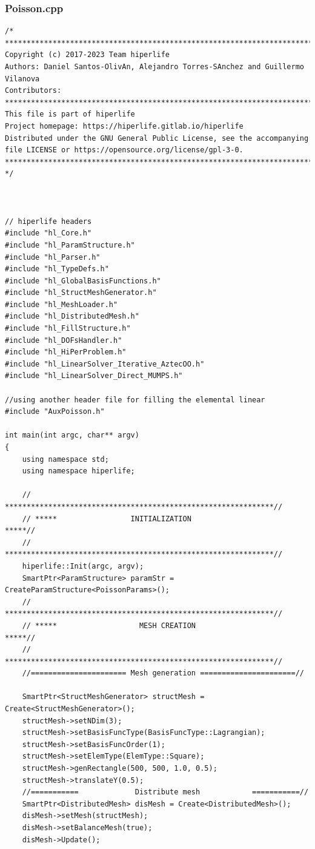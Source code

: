 \documentclass[]{article}
\begin{document}
\subsubsection{Poisson.cpp} \label{sec: m.cpp}
\nolinenumbers
\begin{lstlisting}
/*
*******************************************************************************
Copyright (c) 2017-2023 Team hiperlife
Authors: Daniel Santos-OlivAn, Alejandro Torres-SAnchez and Guillermo Vilanova
Contributors:
*******************************************************************************
This file is part of hiperlife
Project homepage: https://hiperlife.gitlab.io/hiperlife
Distributed under the GNU General Public License, see the accompanying
file LICENSE or https://opensource.org/license/gpl-3-0.
*******************************************************************************
*/



// hiperlife headers
#include "hl_Core.h"
#include "hl_ParamStructure.h"
#include "hl_Parser.h"
#include "hl_TypeDefs.h"
#include "hl_GlobalBasisFunctions.h" 
#include "hl_StructMeshGenerator.h"
#include "hl_MeshLoader.h"
#include "hl_DistributedMesh.h"
#include "hl_FillStructure.h"
#include "hl_DOFsHandler.h"
#include "hl_HiPerProblem.h"
#include "hl_LinearSolver_Iterative_AztecOO.h"
#include "hl_LinearSolver_Direct_MUMPS.h"

//using another header file for filling the elemental linear  
#include "AuxPoisson.h"

int main(int argc, char** argv)
{
	using namespace std;
	using namespace hiperlife;
		
	// **************************************************************//
	// *****                 INITIALIZATION                     *****//
	// **************************************************************//
	hiperlife::Init(argc, argv);
	SmartPtr<ParamStructure> paramStr = CreateParamStructure<PoissonParams>();
	// **************************************************************//
	// *****                   MESH CREATION                    *****//
	// **************************************************************//
	//====================== Mesh generation ======================//
	
	SmartPtr<StructMeshGenerator> structMesh = Create<StructMeshGenerator>();
	structMesh->setNDim(3);
	structMesh->setBasisFuncType(BasisFuncType::Lagrangian);
	structMesh->setBasisFuncOrder(1);
	structMesh->setElemType(ElemType::Square);
	structMesh->genRectangle(500, 500, 1.0, 0.5);
	structMesh->translateY(0.5);
	//===========             Distribute mesh            ===========//
	SmartPtr<DistributedMesh> disMesh = Create<DistributedMesh>();
	disMesh->setMesh(structMesh);
	disMesh->setBalanceMesh(true);
	disMesh->Update();
	

\end{lstlisting}
\end{document}
